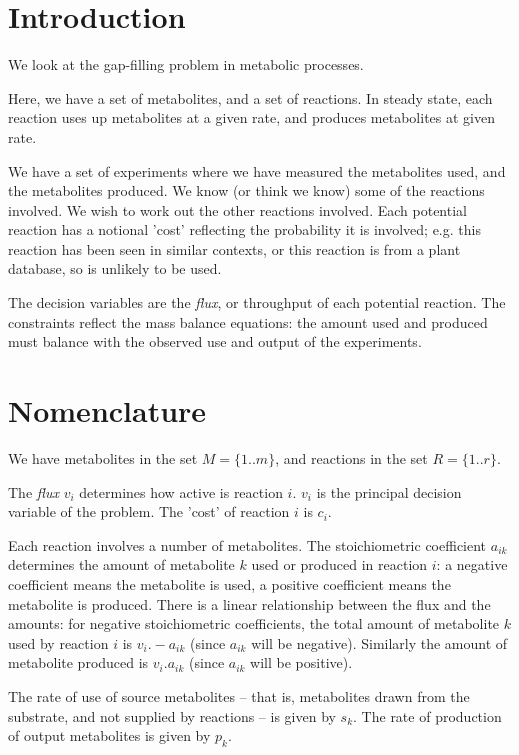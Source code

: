 \documentclass[12pt,twoside,fleqn,a4paper]{article}
\begin{document}
\section{Introduction}

We look at the gap-filling problem in metabolic processes.

Here, we have a set of metabolites, and a set of reactions. In steady
state, each reaction uses up metabolites at a given rate, and produces
metabolites at given rate.

We have a set of experiments where we have measured the metabolites
used, and the metabolites produced. We know (or think we know) some of
the reactions involved. We wish to work out the other reactions
involved. Each potential reaction has a notional 'cost' reflecting the
probability it is involved; e.g. this reaction has been seen in
similar contexts, or this reaction is from a plant database, so is
unlikely to be used.

The decision variables are the \emph{flux}, or throughput of each
potential reaction. The constraints reflect the mass balance
equations: the amount used and produced must balance with the observed
use and output of the experiments.

\section{Nomenclature}

We have metabolites in the set $M = \{1 .. m\}$, and reactions in the
set $R = \{1 .. r\}$.

The \emph{flux} $v_i$ determines how active is reaction $i$. $v_i$ is
the principal decision variable of the problem. The 'cost' of reaction
$i$ is $c_i$.

Each reaction involves a number of metabolites. The stoichiometric
coefficient $a_{ik}$ determines the amount of metabolite $k$ used or
produced in reaction $i$: a negative coefficient means the metabolite
is used, a positive coefficient means the metabolite is
produced. There is a linear relationship between the flux and the
amounts: for negative stoichiometric coefficients, the total amount of
metabolite $k$ used by reaction $i$ is $v_i . -a_{ik}$ (since $a_{ik}$
will be negative). Similarly the amount of metabolite produced is
$v_i . a_{ik}$ (since $a_{ik}$ will be positive).

The rate of use of source metabolites -- that is, metabolites drawn
from the substrate, and not supplied by reactions -- is given by $s_k$.
The rate of production of output metabolites is given by $p_k$.
\end{document}
